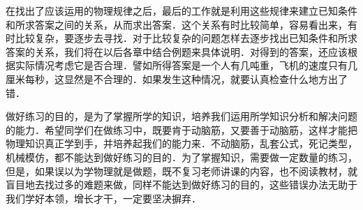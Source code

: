在找出了应该运用的物理规律之后，最后的工作就是利用这些规律来建立已知条件和所求答案之间的关系，从而求出答案．这个关系有时比较简单，容易看出来，有时比较复杂，要逐步去寻找．对于比较复杂的问题怎样去逐步找出已知条件和所求答案的关系，我们将在以后各章中结合例题来具体说明．对得到的答案，还应该根据实际情况考虑它是否合理．譬如所得答案是一个人有几吨重，飞机的速度只有几厘米每秒，这显然是不合理的．如果发生这种情况，就要认真检查什么地方出了错．

做好练习的目的，是为了掌握所学的知识，培养我们运用所学知识分析和解决问题的能力．希望同学们在做练习中，既要肯于动脑筋，又要善于动脑筋，这样才能把物理知识真正学到手，并培养起我们的能力来．不动脑筋，乱套公式，死记类型，机械模仿，都不能达到做好练习的目的．为了掌握知识，需要做一定数量的练习，但是，如果误以为学物理就是做题，既不复习老师讲课的内容，也不阅读教材，就盲目地去找过多的难题来做，同样不能达到做好练习的目的，这些错误办法无助于我们学好本领，增长才干，一定要坚决摒弃．

\clearpage
